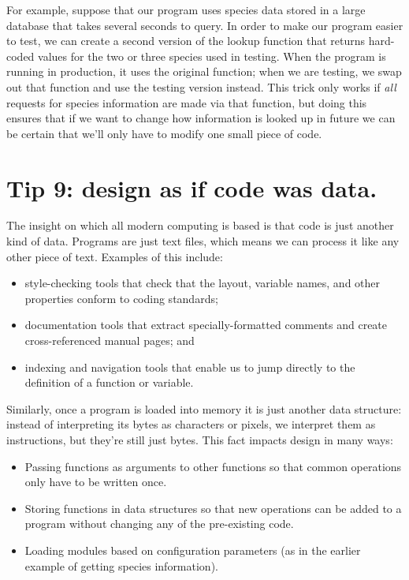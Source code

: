 \documentclass[10pt,letterpaper]{article}
\begin{document}
For example,
suppose that our program uses species data stored in a large database
that takes several seconds to query.
In order to make our program easier to test,
we can create a second version of the lookup function
that returns hard-coded values for
the two or three species used in testing.
When the program is running in production,
it uses the original function;
when we are testing,
we swap out that function and use the testing version instead.
This trick only works if \emph{all} requests for species information
are made via that function,
but doing this ensures that if we want to change how information is looked up in future
we can be certain that we'll only have to modify one small piece of code.
  
\section*{Tip 9: design as if code was data.}

The insight on which all modern computing is based is that
code is just another kind of data.
Programs are just text files,
which means we can process it like any other piece of text.
Examples of this include:

\begin{itemize}
\item
  style-checking tools that check that the layout, variable names, and other properties
  conform to coding standards;
\item
  documentation tools that extract specially-formatted comments
  and create cross-referenced manual pages; and
\item
  indexing and navigation tools that enable us to jump directly to
  the definition of a function or variable.
\end{itemize}

Similarly,
once a program is loaded into memory it is just another data structure:
instead of interpreting its bytes as characters or pixels,
we interpret them as instructions,
but they're still just bytes.
This fact impacts design in many ways:

\begin{itemize}
\item
  Passing functions as arguments to other functions
  so that common operations only have to be written once.
\item
  Storing functions in data structures
  so that new operations can be added to a program
  without changing any of the pre-existing code.
\item
  Loading modules based on configuration parameters
  (as in the earlier example of getting species information).
\end{itemize}
\end{document}
